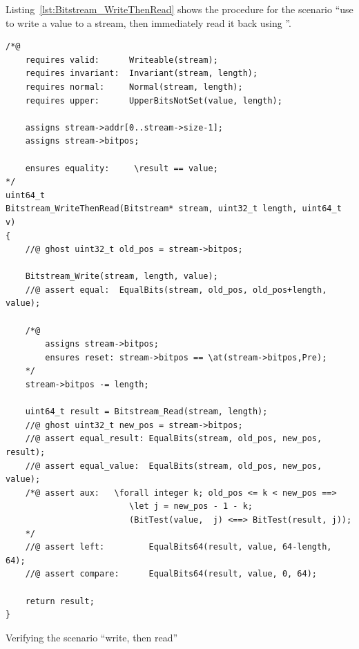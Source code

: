 \FloatBarrier

Listing~\ref{lst:Bitstream_WriteThenRead}
shows the procedure for the scenario ``use 
to write a value to a stream, then immediately read it back using
''.


\begin{listing}[hbt]
\begin{lstlisting}[style=acsl-block]
/*@
    requires valid:      Writeable(stream);
    requires invariant:  Invariant(stream, length);
    requires normal:     Normal(stream, length);
    requires upper:      UpperBitsNotSet(value, length);

    assigns stream->addr[0..stream->size-1];
    assigns stream->bitpos;

    ensures equality:     \result == value;
*/
uint64_t
Bitstream_WriteThenRead(Bitstream* stream, uint32_t length, uint64_t v)
{
    //@ ghost uint32_t old_pos = stream->bitpos;

    Bitstream_Write(stream, length, value);
    //@ assert equal:  EqualBits(stream, old_pos, old_pos+length, value);

    /*@ 
        assigns stream->bitpos;
        ensures reset: stream->bitpos == \at(stream->bitpos,Pre);
    */
    stream->bitpos -= length;

    uint64_t result = Bitstream_Read(stream, length);
    //@ ghost uint32_t new_pos = stream->bitpos;
    //@ assert equal_result: EqualBits(stream, old_pos, new_pos, result);
    //@ assert equal_value:  EqualBits(stream, old_pos, new_pos, value);
    /*@ assert aux:   \forall integer k; old_pos <= k < new_pos ==>
                         \let j = new_pos - 1 - k;
                         (BitTest(value,  j) <==> BitTest(result, j));
    */
    //@ assert left:         EqualBits64(result, value, 64-length, 64);
    //@ assert compare:      EqualBits64(result, value, 0, 64);

    return result;
}
\end{lstlisting}
\caption{\label{lst:Bitstream_WriteThenRead}
	Verifying the scenario ``write, then read'' }
\end{listing}

\FloatBarrier

